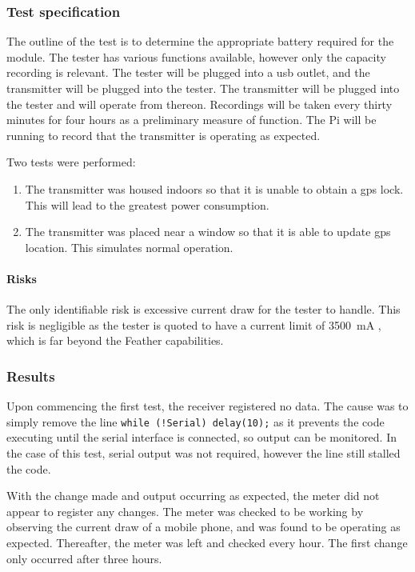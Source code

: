 \subsubsection{Test specification}
\label{sec:powertestspec}
The outline of the test is to determine the appropriate battery required for the module. The tester
has various functions available, however only the capacity recording is relevant. The tester will
be plugged into a \acrshort{usb} outlet, and the transmitter will be plugged into the tester. The transmitter
will be plugged into the tester and will operate from thereon. Recordings will be taken every thirty
minutes for four hours as a preliminary measure of function. The Pi will be running to record
that the transmitter is operating as expected.

Two tests were performed:
\begin{enumerate}
    \item The transmitter was housed indoors so that it is unable to obtain a \acrshort{gps} lock. This
          will lead to the greatest power consumption.
    \item The transmitter was placed near a window so that it is able to update \acrshort{gps} location.
          This simulates normal operation.
\end{enumerate}

\paragraph{Risks}
The only identifiable risk is excessive current draw for the tester to handle. 
This risk is negligible as the tester is quoted to have a current limit 
of \qty{3500}{\mA} \cite{kcx},
which is far beyond the Feather capabilities. 

\subsubsection{Results}
Upon commencing the first test, the receiver registered no data. The cause was to simply
remove the line \lstinline{while (!Serial) delay(10);} as it prevents the code executing
until the serial interface is connected, so output can be monitored. In the case of this test,
serial output was not required, however the line still stalled the code.

With the change made and output occurring as expected, the meter did not appear to
register any changes. The meter was checked to be working by observing the current 
draw of a mobile phone, and was found to be operating as expected.
Thereafter, the meter was left and checked every hour.
The first change only occurred after three hours.

